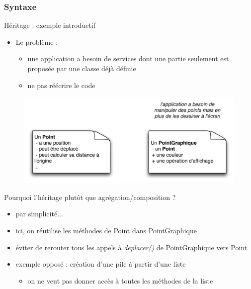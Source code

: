 \subsubsection*{Syntaxe}

\begin{frame}{Héritage : exemple introductif}
\begin{itemize}
	\item Le problème :
	\begin{itemize}
		\item une application a besoin de services dont une partie seulement est proposée par une classe déjà définie
		\item ne pas réécrire le code
	\end{itemize}
\end{itemize}
\begin{figure}[htbp]
    \begin{center}
      \includegraphics[scale=.42]{fig/pointgraphique.pdf}
    \end{center}
  \end{figure}
\end{frame}

\begin{frame}{Pourquoi l'héritage plutôt que agrégation/composition ?}
\begin{itemize}
	\item par simplicité...
	\item ici, on réutilise les méthodes de {Point} dans {PointGraphique}
	\item éviter de rerouter tous les appels à \textit{deplacer()} de {PointGraphique} vers {Point}
	\item exemple opposé : création d'une pile à partir d'une liste
	\begin{itemize}
		\item on ne veut pas donner accès à toutes les méthodes de la liste
	\end{itemize}
\end{itemize}
\end{frame}

